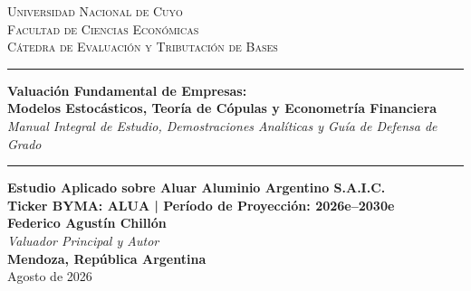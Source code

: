 \documentclass[10pt,a4paper]{article}
\theoremstyle{definition}
\begin{document}
\vspace*{1.5cm}
\begin{center}
    {\scshape\Large Universidad Nacional de Cuyo}\\[0.2cm]
    {\scshape\large Facultad de Ciencias Económicas}\\[0.2cm]
    {\scshape\normalsize Cátedra de Evaluación y Tributación de Bases}\\[1.5cm]
    
    \rule{\linewidth}{1.5pt}\vskip 3pt
    {\Huge\textbf{\color{primary}Valuación Fundamental de Empresas:}}\\[0.35cm]
    {\LARGE\textbf{\color{primary}Modelos Estocásticos, Teoría de Cópulas y Econometría Financiera}}\\[0.35cm]
    {\large\textit{\color{secondary}Manual Integral de Estudio, Demostraciones Analíticas y Guía de Defensa de Grado}}\\[0.25cm]
    \rule{\linewidth}{0.8pt}\vskip 1.5cm
    
    {\Large\textbf{Estudio Aplicado sobre Aluar Aluminio Argentino S.A.I.C.}}\\[0.2cm]
    {\normalsize\textbf{Ticker BYMA: ALUA | Período de Proyección: 2026e--2030e}}\\[2.5cm]
    
    \textbf{\large Federico Agustín Chillón}\\[0.2cm]
    \textit{\normalsize Valuador Principal y Autor}\\[2.0cm]
    
    \vfill
    {\large\textbf{Mendoza, República Argentina}}\\[0.15cm]
    {\normalsize\color{secondary}Agosto de 2026}
\end{center}

\clearpage
\thispagestyle{empty}
\end{document}
